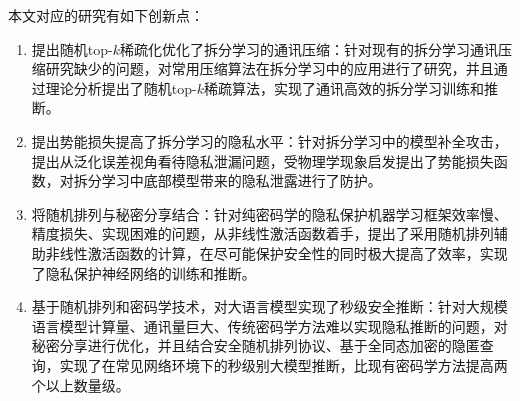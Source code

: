 本文对应的研究有如下创新点：
\begin{enumerate}
    \item 提出随机top-$k$稀疏化优化了拆分学习的通讯压缩：针对现有的拆分学习通讯压缩研究缺少的问题，对常用压缩算法在拆分学习中的应用进行了研究，并且通过理论分析提出了随机top-$k$稀疏算法，实现了通讯高效的拆分学习训练和推断。
    \item 提出势能损失提高了拆分学习的隐私水平：针对拆分学习中的模型补全攻击，提出从泛化误差视角看待隐私泄漏问题，受物理学现象启发提出了势能损失函数，对拆分学习中底部模型带来的隐私泄露进行了防护。
    \item 将随机排列与秘密分享结合：针对纯密码学的隐私保护机器学习框架效率慢、精度损失、实现困难的问题，从非线性激活函数着手，提出了采用随机排列辅助非线性激活函数的计算，在尽可能保护安全性的同时极大提高了效率，实现了隐私保护神经网络的训练和推断。
    \item 基于随机排列和密码学技术，对大语言模型实现了秒级安全推断：针对大规模语言模型计算量、通讯量巨大、传统密码学方法难以实现隐私推断的问题，对秘密分享进行优化，并且结合安全随机排列协议、基于全同态加密的隐匿查询，实现了在常见网络环境下的秒级别大模型推断，比现有密码学方法提高两个以上数量级。
\end{enumerate}
